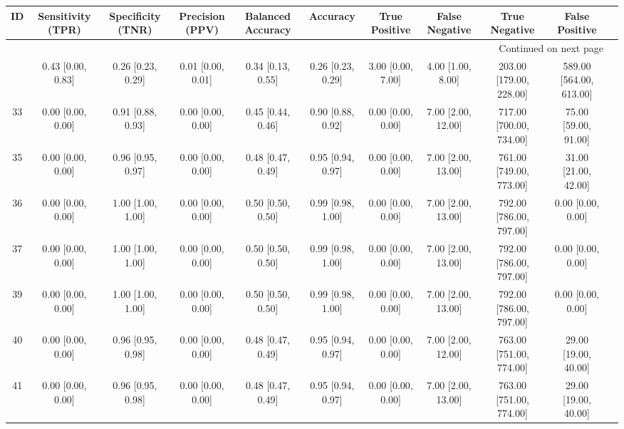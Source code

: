 \documentclass[8pt]{article}
\begin{document}
\begin{center}
\begin{footnotesize}
\begin{longtable}{|ccccccccccc|}
\toprule
 ID &  Sensitivity (TPR) &  Specificity (TNR) &    Precision (PPV) &  Balanced Accuracy &           Accuracy &      True Positive &      False Negative &            True Negative &           False Positive \\
\midrule
\endhead
\midrule
\multicolumn{10}{r}{{Continued on next page}} \\
\midrule
\endfoot

\bottomrule
\endlastfoot
 38 &  0.43 [0.00, 0.83] &  0.26 [0.23, 0.29] &  0.01 [0.00, 0.01] &  0.34 [0.13, 0.55] &  0.26 [0.23, 0.29] &  3.00 [0.00, 7.00] &   4.00 [1.00, 8.00] &  203.00 [179.00, 228.00] &  589.00 [564.00, 613.00] \\
 33 &  0.00 [0.00, 0.00] &  0.91 [0.88, 0.93] &  0.00 [0.00, 0.00] &  0.45 [0.44, 0.46] &  0.90 [0.88, 0.92] &  0.00 [0.00, 0.00] &  7.00 [2.00, 12.00] &  717.00 [700.00, 734.00] &     75.00 [59.00, 91.00] \\
 35 &  0.00 [0.00, 0.00] &  0.96 [0.95, 0.97] &  0.00 [0.00, 0.00] &  0.48 [0.47, 0.49] &  0.95 [0.94, 0.97] &  0.00 [0.00, 0.00] &  7.00 [2.00, 13.00] &  761.00 [749.00, 773.00] &     31.00 [21.00, 42.00] \\
 36 &  0.00 [0.00, 0.00] &  1.00 [1.00, 1.00] &  0.00 [0.00, 0.00] &  0.50 [0.50, 0.50] &  0.99 [0.98, 1.00] &  0.00 [0.00, 0.00] &  7.00 [2.00, 13.00] &  792.00 [786.00, 797.00] &        0.00 [0.00, 0.00] \\
 37 &  0.00 [0.00, 0.00] &  1.00 [1.00, 1.00] &  0.00 [0.00, 0.00] &  0.50 [0.50, 0.50] &  0.99 [0.98, 1.00] &  0.00 [0.00, 0.00] &  7.00 [2.00, 13.00] &  792.00 [786.00, 797.00] &        0.00 [0.00, 0.00] \\
 39 &  0.00 [0.00, 0.00] &  1.00 [1.00, 1.00] &  0.00 [0.00, 0.00] &  0.50 [0.50, 0.50] &  0.99 [0.98, 1.00] &  0.00 [0.00, 0.00] &  7.00 [2.00, 13.00] &  792.00 [786.00, 797.00] &        0.00 [0.00, 0.00] \\
 40 &  0.00 [0.00, 0.00] &  0.96 [0.95, 0.98] &  0.00 [0.00, 0.00] &  0.48 [0.47, 0.49] &  0.95 [0.94, 0.97] &  0.00 [0.00, 0.00] &  7.00 [2.00, 12.00] &  763.00 [751.00, 774.00] &     29.00 [19.00, 40.00] \\
 41 &  0.00 [0.00, 0.00] &  0.96 [0.95, 0.98] &  0.00 [0.00, 0.00] &  0.48 [0.47, 0.49] &  0.95 [0.94, 0.97] &  0.00 [0.00, 0.00] &  7.00 [2.00, 13.00] &  763.00 [751.00, 774.00] &     29.00 [19.00, 40.00] \\

\end{longtable}
\end{footnotesize}
\end{center}
\end{document}
